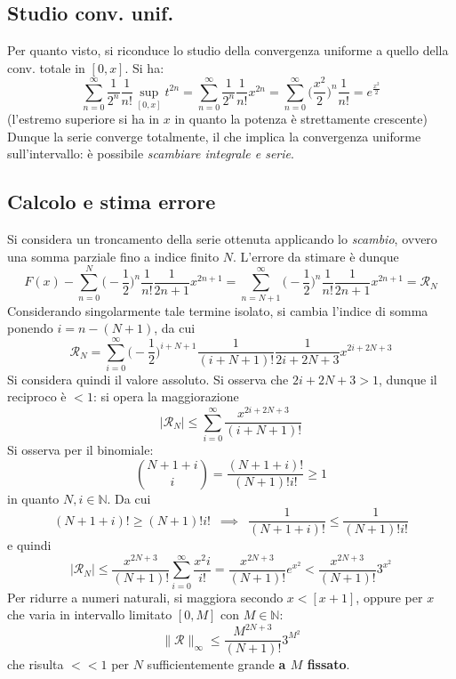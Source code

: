 \documentclass[10pt, oneside]{book}
\theoremstyle{plain}
\begin{document}
\subsection*{Studio conv. unif.}
Per quanto visto, si riconduce lo studio della convergenza uniforme a quello della conv. totale in $[0, x]$. Si ha:
\[\sum\limits_{n=0}^\infty \frac{1}{2^n} \frac{1}{n!} \sup\limits_{[0,x]}t^{2n} = \sum\limits_{n=0}^\infty \frac{1}{2^n} \frac{1}{n!} x^{2n} = \sum\limits_{n=0}^\infty \big(\frac{x^2}{2}\big)^n \frac{1}{n!} = e^{\displaystyle \frac{x^2}{2}}\]
(l'estremo superiore si ha in $x$ in quanto la potenza è strettamente crescente)
\\Dunque la serie converge totalmente, il che implica la convergenza uniforme sull'intervallo: è possibile \textit{scambiare integrale e serie}.

\subsection*{Calcolo e stima errore}
Si considera un troncamento della serie ottenuta applicando lo \textit{scambio}, ovvero una somma parziale fino a indice finito $N$. L'errore da stimare è dunque
\[F(x) - \sum\limits_{n=0}^N \big( - \frac{1}{2}\big)^n\frac{1}{n!}\frac{1}{2n + 1}x^{2n + 1} = \sum\limits_{n=N+1}^\infty \big( - \frac{1}{2}\big)^n\frac{1}{n!}\frac{1}{2n + 1}x^{2n + 1} = \mathcal{R}_N\]
Considerando singolarmente tale termine isolato, si cambia l'indice di somma ponendo $i = n - (N+1)$, da cui
\[\mathcal{R}_N = \sum\limits_{i=0}^\infty \big( - \frac{1}{2}\big)^{i + N + 1}\frac{1}{(i + N + 1)!}\frac{1}{2i + 2N + 3}x^{2i + 2N + 3}\]
Si considera quindi il valore assoluto. Si osserva che $2i + 2N + 3 > 1$, dunque il reciproco è $< 1$: si opera la maggiorazione
\[|\mathcal{R}_N| \leq \sum\limits_{i=0}^\infty \frac{x^{2i + 2N + 3}}{(i + N + 1)!}\]
Si osserva per il binomiale:
\[\binom{N + 1 + i}{i} = \frac{(N + 1 + i)!}{(N+1)! i!} \geq 1\]
in quanto $N, i \in \mathbb{N}$. Da cui
\[(N+1+i)! \geq (N+1)! i! \enspace \implies \enspace \frac{1}{(N+1+i)!} \leq \frac{1}{(N+1)! i!}\]
e quindi
\[|\mathcal{R}_N| \leq \frac{x^{2N + 3}}{(N+1)!}\sum\limits_{i=0}^\infty \frac{x^2i}{i!} = \frac{x^{2N + 3}}{(N+1)!} e^{x^2} < \frac{x^{2N + 3}}{(N+1)!}3^{x^2}\]
Per ridurre a numeri naturali, si maggiora secondo $x < [x+1]$, oppure per $x$ che varia in intervallo limitato $[0,M]$ con $M \in \mathbb{N}$:
\[\|\mathcal{R}\|_\infty \leq \frac{M^{2N + 3}}{(N+1)!}3^{M^2}\]
che risulta $<< 1$ per $N$ sufficientemente grande \textbf{a $M$ fissato}.
\end{document}
